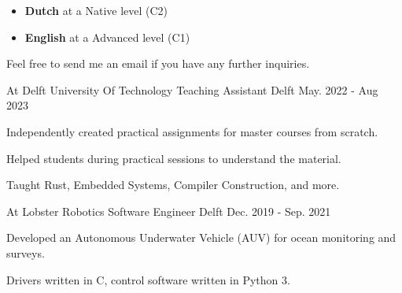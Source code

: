 \documentclass[11pt, a4paper]{awesome-cv}
\begin{document}
\begin{paracol}{2}
	
	\begin{cvparagraph}
		\begin{itemize}[leftmargin=*]
			\item \textbf{Dutch} at a Native level (C2)
			\item \textbf{English} at a Advanced level (C1)
		\end{itemize}
	\end{cvparagraph}


	\begin{cvparagraph}
		Feel free to send me an email if you have any further inquiries.
	\end{cvparagraph}

	
	\switchcolumn
		
	\begin{cventries}
		\cventry
		{At Delft University Of Technology}
		{Teaching Assistant}
		{Delft}
		{May. 2022 - Aug 2023}
		{
			\begin{cvitems}
				\item Independently created practical assignments for master courses from scratch.
				\item Helped students during practical sessions to understand the material.
				\item Taught Rust, Embedded Systems, Compiler Construction, and more.
			\end{cvitems}
		}
		
		\cventry
		{At Lobster Robotics}
		{Software Engineer}
		{Delft}
		{Dec. 2019 - Sep. 2021}
		{
			\begin{cvitems}
				\item {Developed an Autonomous Underwater Vehicle (AUV) for ocean monitoring and surveys. }
				\item {Drivers written in C, control software written in Python 3.}
			\end{cvitems}
		}
	\end{cventries}

	

\end{paracol}
\end{document}
